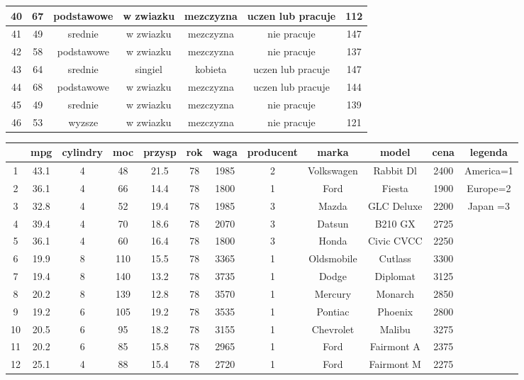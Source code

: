 \documentclass[12pt]{report}\usepackage[]{graphicx}\usepackage[]{color}
\begin{document}
\begin{table}[ht!]
\begin{tabular}{c|c|c|c|c|c|c}
 \hline
40 & 67& podstawowe& w zwiazku& mezczyzna& uczen lub pracuje& 112 \\
 \hline
41 & 49& srednie& w zwiazku& mezczyzna& nie pracuje& 147 \\
 \hline
42 & 58& podstawowe& w zwiazku& mezczyzna& nie pracuje& 137 \\
 \hline
43 & 64& srednie& singiel& kobieta& uczen lub pracuje& 147 \\
 \hline
44 & 68& podstawowe& w zwiazku& mezczyzna& uczen lub pracuje& 144 \\
 \hline
45 & 49& srednie& w zwiazku& mezczyzna& nie pracuje& 139 \\
 \hline
46 & 53& wyzsze& w zwiazku& mezczyzna& nie pracuje& 121 \\
 \end{tabular}
\end{table}\begin{table}[ht!]
\centering
 \begin{tabular}{c|c|c|c|c|c|c|c|c|c|c|c} 
 &  mpg & cylindry & moc & przysp & rok & waga & producent & marka & model & cena & legenda \\ \hline
1 & 43.1& 4& 48& 21.5& 78& 1985& 2& Volkswagen& Rabbit Dl & 2400& America=1 \\
 \hline
2 & 36.1& 4& 66& 14.4& 78& 1800& 1& Ford      & Fiesta    & 1900& Europe=2 \\
 \hline
3 & 32.8& 4& 52& 19.4& 78& 1985& 3& Mazda     & GLC Deluxe& 2200& Japan =3 \\
 \hline
4 & 39.4& 4& 70& 18.6& 78& 2070& 3& Datsun    & B210 GX   & 2725&         \\
 \hline
5 & 36.1& 4& 60& 16.4& 78& 1800& 3& Honda     & Civic CVCC& 2250&         \\
 \hline
6 & 19.9& 8& 110& 15.5& 78& 3365& 1& Oldsmobile& Cutlass   & 3300&         \\
 \hline
7 & 19.4& 8& 140& 13.2& 78& 3735& 1& Dodge     & Diplomat  & 3125&         \\
 \hline
8 & 20.2& 8& 139& 12.8& 78& 3570& 1& Mercury   & Monarch   & 2850&         \\
 \hline
9 & 19.2& 6& 105& 19.2& 78& 3535& 1& Pontiac   & Phoenix   & 2800&         \\
 \hline
10 & 20.5& 6& 95& 18.2& 78& 3155& 1& Chevrolet & Malibu    & 3275&         \\
 \hline
11 & 20.2& 6& 85& 15.8& 78& 2965& 1& Ford      & Fairmont A& 2375&         \\
 \hline
12 & 25.1& 4& 88& 15.4& 78& 2720& 1& Ford      & Fairmont M& 2275&         \\

\end{tabular}
\end{table}
\end{document}
